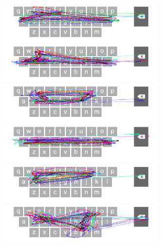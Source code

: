 \begin{figure}[t]
	\begin{minipage}[t]{8in}
	\hspace{-20pt}
	\begin{minipage}[t]{3.1in}
		\includegraphics[width=3.3in]{Figures/fig_tale_paths}
	\end{minipage}
	\begin{minipage}[t]{3in}
		\includegraphics[width=3.3in]{Figures/fig_dales_paths}
	\end{minipage}
	\end{minipage}
	
	\begin{minipage}[t]{8in}
	\hspace{-20pt}
	\begin{minipage}[t]{3.1in}
		\includegraphics[width=3.3in]{Figures/fig_shied_paths}
	\end{minipage}
	\begin{minipage}[t]{3in}
		\includegraphics[width=3.3in]{Figures/fig_halls_paths}
	\end{minipage}
	\end{minipage}
	
	\begin{minipage}[t]{8in}
	\hspace{-20pt}
	\begin{minipage}[t]{3.1in}
		\includegraphics[width=3.3in]{Figures/fig_sites_paths}
	\end{minipage}
	\begin{minipage}[t]{3in}
		\includegraphics[width=3.3in]{Figures/fig_sinned_paths}
	\end{minipage}
	\end{minipage}
	

\end{figure}
